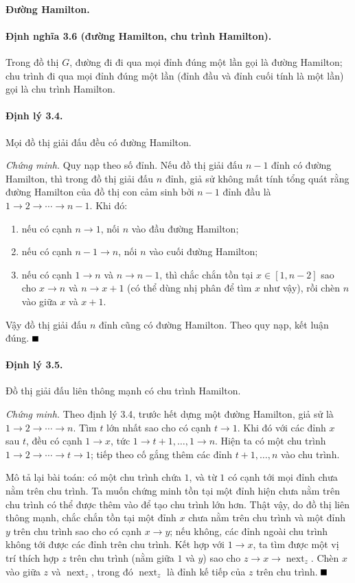 \documentclass[11pt]{article}
\providecommand{\square}{\mathord{\vcenter{\hrule height .6em width .6em}}}
\begin{document}
\paragraph{Đường Hamilton.}

\paragraph{Định nghĩa 3.6 (đường Hamilton, chu trình Hamilton).}
Trong đồ thị $G$, đường đi đi qua mọi đỉnh đúng một lần gọi là đường Hamilton;
chu trình đi qua mọi đỉnh đúng một lần (đỉnh đầu và đỉnh cuối tính là một lần)
gọi là chu trình Hamilton.

\paragraph{Định lý 3.4.}
Mọi đồ thị giải đấu đều có đường Hamilton.

\emph{Chứng minh.}
Quy nạp theo số đỉnh. Nếu đồ thị giải đấu $n-1$ đỉnh có đường Hamilton, thì
trong đồ thị giải đấu $n$ đỉnh, giả sử không mất tính tổng quát rằng đường
Hamilton của đồ thị con cảm sinh bởi $n-1$ đỉnh đầu là
$1\to2\to\cdots\to n-1$. Khi đó:
\begin{enumerate}
  \item nếu có cạnh $n\to1$, nối $n$ vào đầu đường Hamilton;
  \item nếu có cạnh $n-1\to n$, nối $n$ vào cuối đường Hamilton;
  \item nếu có cạnh $1\to n$ và $n\to n-1$, thì chắc chắn tồn tại
  $x\in[1,n-2]$ sao cho $x\to n$ và $n\to x+1$ (có thể dùng nhị phân để tìm
  $x$ như vậy), rồi chèn $n$ vào giữa $x$ và $x+1$.
\end{enumerate}
Vậy đồ thị giải đấu $n$ đỉnh cũng có đường Hamilton. Theo quy nạp, kết luận
đúng. \hfill$\square$

\paragraph{Định lý 3.5.}
Đồ thị giải đấu liên thông mạnh có chu trình Hamilton.

\emph{Chứng minh.}
Theo định lý 3.4, trước hết dựng một đường Hamilton, giả sử là
$1\to2\to\cdots\to n$. Tìm $t$ lớn nhất sao cho có cạnh $t\to1$. Khi đó với các
đỉnh $x$ sau $t$, đều có cạnh $1\to x$, tức
$1\to t+1,\ldots,1\to n$. Hiện ta có một chu trình
$1\to2\to\cdots\to t\to1$; tiếp theo cố gắng thêm các đỉnh $t+1,\ldots,n$ vào
chu trình.

Mô tả lại bài toán: có một chu trình chứa $1$, và từ $1$ có cạnh tới mọi đỉnh
chưa nằm trên chu trình. Ta muốn chứng minh tồn tại một đỉnh hiện chưa nằm trên
chu trình có thể được thêm vào để tạo chu trình lớn hơn. Thật vậy, do đồ thị
liên thông mạnh, chắc chắn tồn tại một đỉnh $x$ chưa nằm trên chu trình và một
đỉnh $y$ trên chu trình sao cho có cạnh $x\to y$; nếu không, các đỉnh ngoài chu
trình không tới được các đỉnh trên chu trình. Kết hợp với $1\to x$, ta tìm được
một vị trí thích hợp $z$ trên chu trình (nằm giữa $1$ và $y$) sao cho
$z\to x\to\operatorname{next}_z$. Chèn $x$ vào giữa $z$ và
$\operatorname{next}_z$, trong đó $\operatorname{next}_z$ là đỉnh kế tiếp của
$z$ trên chu trình. \hfill$\square$
\end{document}
